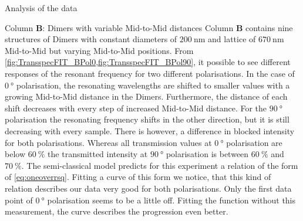 \documentclass[pdftex, a4paper,11pt, twoside, UKenglish]{report}
\begin{document}
\begin{chapter}{Analysis of the data}
    \newpage
    \begin{section}{Column \textbf{B}: Dimers with variable Mid-to-Mid
        distances}
      \label{chp:DataB}
      Column \textbf{B} contains nine structures of Dimers with constant
      diameters of $\SI{200}{\nano\meter}$ and lattice of
      $\SI{670}{\nano\meter}$ Mid-to-Mid but varying Mid-to-Mid positions. From
      \cref{fig:TransspecFIT_BPol0,fig:TransspecFIT_BPol90}, it possible to see
      different responses of the resonant frequency for two different
      polarisations. In the case of $\SI{0}{\degree}$ polarisation, the
      resonating wavelengths are shifted to smaller values with a growing
      Mid-to-Mid distance in the Dimers. Furthermore, the distance of each
      shift decreases with every step of increased Mid-to-Mid distance.
      For the $\SI{90}{\degree}$ polarisation the resonating frequency shifts
      in the other direction, but it is still decreasing with every sample.
      There is however, a difference in blocked intensity for both
      polarisations. Whereas all transmission values at $\SI{0}{\degree}$
      polarisation are below $\SI{60}{\percent}$ the transmitted intensity
      at $\SI{90}{\degree}$ polarisation is between $\SI{60}{\percent}$ and 
      $\SI{70}{\percent}$.\newline
      The semi-classical model predicts for this experiment a relation of the
      form of \cref{eq:oneoverrsq}. Fitting a curve of this form we notice,
      that this kind of relation describes our data very good for both
      polarisations. Only the first data point of $\SI{0}{\degree}$ polarisation
      seems to be a little off. Fitting the function without this measurement,
      the curve describes the progression even better.
      
      

\end{section}
\end{chapter}
\end{document}
